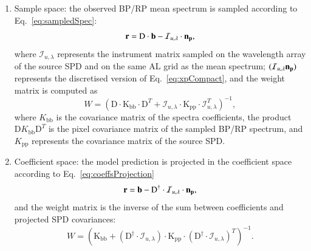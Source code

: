 \documentclass{aa}
\newcommand{\equref}[1]{Eq.~\ref{eq:#1}}
\begin{document}
\begin{enumerate}
    \item Sample space: the observed BP/RP mean spectrum is sampled according to \equref{sampledSpec}:
    \begin{equation}
        \textbf{r} =  \mathrm{D} \cdot \textbf{b} - \mathcal{I}_{u,\lambda} \cdot \bf{n_p}
        \label{eq:sampleSpace}
    ,\end{equation}
    where $\mathcal{I}_{u,\lambda}$ represents the instrument matrix sampled on the wavelength array of the source SPD and on the same AL grid as the mean spectrum; $(\mathcal{I}_{u,\lambda}\bf{n_p})$ represents the discretised version of \equref{xpCompact}, and the weight matrix is computed as
    \begin{equation}
        W = \left( \mathrm{D} \cdot \textrm{K}_\textrm{bb} \cdot \mathrm{D}^T 
        + \mathcal{I}_{u,\lambda} \cdot \textrm{K}_\textrm{pp} \cdot \mathcal{I}_{u,\lambda}^T\right)^{-1}
    ,\end{equation}
    where $K_\textrm{bb}$ is the covariance matrix of the spectra coefficients, the product $\mathrm{D} K_\textrm{bb} \mathrm{D}^T$ is the pixel covariance matrix of the sampled BP/RP spectrum, and $K_\textrm{pp}$ represents the covariance matrix of the source SPD.
    
    \item Coefficient space: the model prediction is projected in the coefficient space according to \equref{coeffsProjection}
    \begin{equation}
        \textbf{r} =  \textbf{b} - \mathrm{D}^\dagger \cdot \mathcal{I}_{u,\lambda} \cdot \bf{n_p}
        \label{eq:coeffResiduals}
    ,\end{equation}
    and the weight matrix is the inverse of the sum between coefficients and projected SPD covariances:
    \begin{equation}
        W = \left( \textrm{K}_\textrm{bb} + 
        \left(\mathrm{D}^\dagger \cdot \mathcal{I}_{u,\lambda}\right)
        \cdot \textrm{K}_\textrm{pp} \cdot
        \left(\mathrm{D}^\dagger \cdot \mathcal{I}_{u,\lambda}\right)^T
        \right)^{-1}
        \label{eq:coeffFullCovariance}
    .\end{equation}
\end{enumerate}
\end{document}
